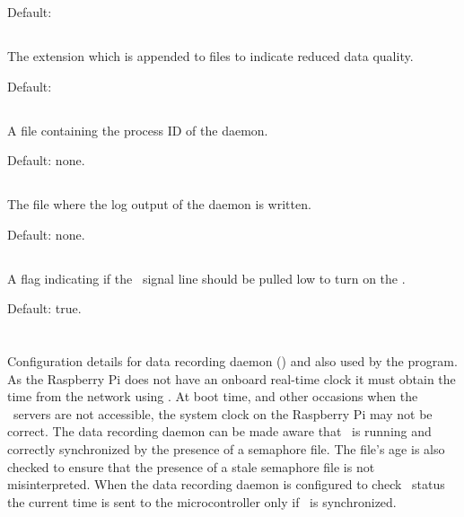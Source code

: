 Default: 

\subsection{}
The extension which is appended to files to indicate reduced data
quality.

Default: 

\subsection{}
A file containing the process ID of the 
daemon.

Default: none.

\subsection{}
The file where the log output of the 
daemon is written.

Default: none.

\subsection{}
A flag indicating if the \dtr\ signal line should be pulled low to
turn on the \led.

Default: true.

\section{}

Configuration details for data recording daemon ()
and also used by the  program. As the
Raspberry Pi does not have an onboard real-time clock it must obtain
the time from the network using \ntp. At boot time, and other
occasions when the \ntp\ servers are not accessible, the system clock
on the Raspberry Pi may not be correct. The data recording daemon can
be made aware that \ntp\ is running and correctly synchronized by the
presence of a semaphore file. The file's age is also checked to ensure
that the presence of a stale semaphore file is not
misinterpreted. When the data recording daemon is configured to check
\ntp\ status the current time is sent to the microcontroller only if
\ntp\ is synchronized.

